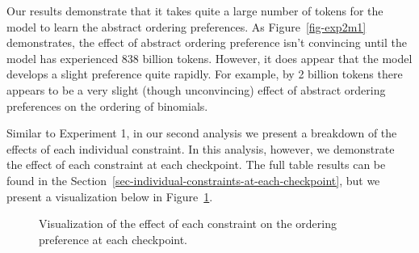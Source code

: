 \documentclass[
  nottoc]{article}
\begin{document}
Our results demonstrate that it takes quite a large number of tokens for
the model to learn the abstract ordering preferences. As
Figure~\ref{fig-exp2m1} demonstrates, the effect of abstract ordering
preference isn't convincing until the model has experienced 838 billion
tokens. However, it does appear that the model develops a slight
preference quite rapidly. For example, by 2 billion tokens there appears
to be a very slight (though unconvincing) effect of abstract ordering
preferences on the ordering of binomials.

Similar to Experiment 1, in our second analysis we present a breakdown
of the effects of each individual constraint. In this analysis, however,
we demonstrate the effect of each constraint at each checkpoint. The
full table results can be found in the
Section~\ref{sec-individual-constraints-at-each-checkpoint}, but we
present a visualization below in Figure~\ref{fig-exp2m2}.

\begin{figure}


\caption{\label{fig-exp2m2}Visualization of the effect of each
constraint on the ordering preference at each checkpoint.}

\end{figure}%
\end{document}
